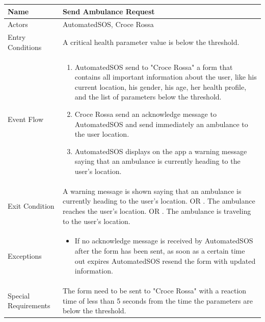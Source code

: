 \begin{enumerate}
\FloatBarrier
\begin{table}[h]
\begin{tabular}{|l|p{}|}
\hline
Name             & Send Ambulance Request \\ \hline
Actors           & AutomatedSOS, Croce Rossa  \\ \hline
Entry Conditions & A critical health parameter value is below the threshold.
\\ \hline
Event Flow       & \begin{enumerate}
            \item AutomatedSOS send to "Croce Rossa" a form that contains all important information about the user, like his current location, his gender, his age, her health profile, and the list of parameters below the threshold.
            \item Croce Rossa send an acknowledge message to AutomatedSOS and send immediately an ambulance to the user location.
            \item AutomatedSOS displays on the app a warning message saying that an ambulance is currently heading to the user's location. 
        \end{enumerate}
\\ \hline
Exit Condition   & A warning message is shown saying that an ambulance is currently heading to the user's location. OR . The ambulance reaches the user's location. OR . The ambulance is traveling to the user's location.
\\ \hline
Exceptions       & \begin{itemize}
\item If no acknowledge message is received by AutomatedSOS after the form has been sent, as soon as a certain time out expires AutomatedSOS resend the form with updated information. 
\end{itemize}
\\ \hline
Special Requirements   & The form need to be sent to "Croce Rossa" with a reaction time of less than 5 seconds from the time the parameters are below the threshold.
\\ \hline 
\end{tabular}
\end{table}
\FloatBarrier


\end{enumerate}
